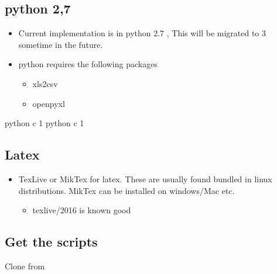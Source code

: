\documentclass[letterpaper,10pt,english]{sphinxmanual}
\begin{document}
\subsection{python 2,7}
\label{\detokenize{intro:python-2-7}}\begin{itemize}
\item {} 
Current implementation is in python 2.7 , This will be migrated to 3 sometime
in the future.

\item {} 
python requires the following packages
\begin{itemize}
\item {} 
xls2csv

\item {} 
openpyxl

\end{itemize}

\end{itemize}

%
\begin{sphinxVerbatim}[commandchars=\\\{\}]
\PYGZdl{} python \PYGZhy{}c 
1
\PYGZdl{} python \PYGZhy{}c 
1
\end{sphinxVerbatim}


\subsection{Latex}
\label{\detokenize{intro:latex}}\begin{itemize}
\item {} 
TexLive or MikTex for latex. These are usually found bundled in linux
distributions. MikTex can be installed on windows/Mac etc.
\begin{itemize}
\item {} 
texlive/2016 is known good

\end{itemize}

\end{itemize}


\subsection{Get the scripts}
\label{\detokenize{intro:get-the-scripts}}
Clone from
\end{document}
